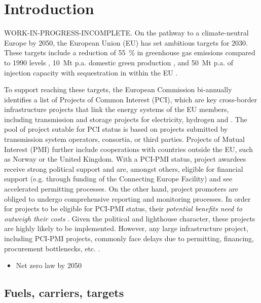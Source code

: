 \documentclass[preprint,12pt,sort&compress]{elsarticle}
\begin{document}
\section{Introduction}
\label{sec:introduction}
WORK-IN-PROGRESS-INCOMPLETE. On the pathway to a climate-neutral Europe by 2050, the European Union (EU) has set ambitious targets for 2030. These targets include a reduction of \SI{55}{\percent} in greenhouse gas emissions compared to 1990 levels \cite{europeancommissionFit55Delivering2021}, \SI{10}{Mt} p.a. domestic green  production \cite{europeancommissionREPowerEUPlanCommunication2022}, and \SI{50}{Mt} p.a. of  injection capacity with sequestration in within the EU \cite{europeanparliamentRegulationEU20242024}.

To support reaching these targets, the European Commission bi-annually identifies a list of Projects of Common Interest (PCI), which are key cross-border infrastructure projects that link the energy systems of the EU members, including transmission and storage projects for electricity, hydrogen and  \cite{europeancommissionCommissionDelegatedRegulation2023}. 
The pool of project sutable for PCI status is based on projects submitted by transmission system operators, consortia, or third parties. Projects of Mutual Interest (PMI) further include cooperations with countries outside the EU, such as Norway or the United Kingdom. With a PCI-PMI status, project awardees receive strong political support and are, amongst others, eligible for financial support (e.g. through funding of the Connecting Europe Facility) and see accelerated permitting processes. On the other hand, project promoters are obliged to undergo comprehensive reporting and monitoring processes. 
In order for projects to be eligible for PCI-PMI status, their \textit{potential benefits need to outweigh their costs} \cite{europeancommissionCommissionDelegatedRegulation2023}. Given the political and lighthouse character, these projects are highly likely to be implemented. However, any large infrastructure project, including PCI-PMI projects, commonly face delays due to permitting, financing, procurement bottlenecks, etc. \cite
{acerConsolidatedReportProgress2023}.

\begin{itemize}
  \item Net zero law by 2050 \citet{europeanparliamentRegulationEU20242024}
\end{itemize}

\subsection{Fuels, carriers, targets}
\end{document}
